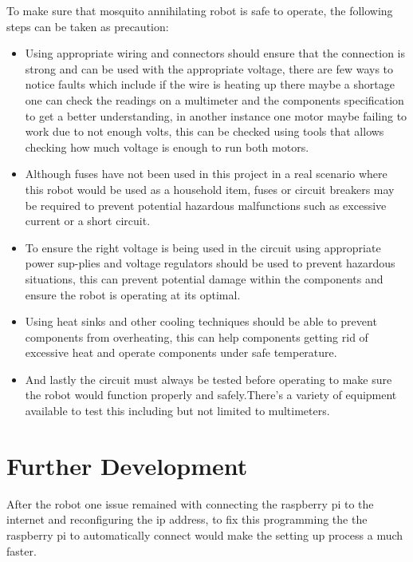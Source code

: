\documentclass[11pt]{article}
\begin{document}
	To make sure that mosquito annihilating robot is safe to operate, the following steps can be taken as precaution:
	\begin{itemize}
		\item 	Using appropriate wiring and connectors should ensure that the connection is strong and can be used with the appropriate voltage, there are few ways to notice faults which include if the wire is heating up there maybe a shortage one can check the readings on a multimeter and the components specification to get a better understanding, in another instance one motor maybe failing to work due to not enough volts, this can be checked using tools that allows checking how much voltage is enough to run both motors.
		\item 
		Although fuses have not been used in this project in a real scenario where this robot would be used as a household item, fuses or circuit breakers may be required to prevent potential hazardous malfunctions such as excessive current or a short circuit.
		\item To ensure the right voltage is being used in the circuit using appropriate power sup-plies and voltage regulators should be used to prevent hazardous situations, this can prevent potential damage within the components and ensure the robot is operating at its optimal.
		\item Using heat sinks and other cooling techniques should be able to prevent components from overheating, this can help components getting rid of excessive heat and operate components under safe temperature.
		\item And lastly the circuit must always be tested before operating to make sure the robot would function properly and safely.There's a variety of equipment available to test this including but not limited to multimeters.
		
		
		
	\end{itemize}
	

	
	
	
	
	


	
	
	\section{Further Development}
	

After the robot one issue remained with connecting the raspberry pi to the internet and reconfiguring the ip address, to fix this programming the the raspberry pi to automatically connect would make the setting up process a much faster.
\end{document}
